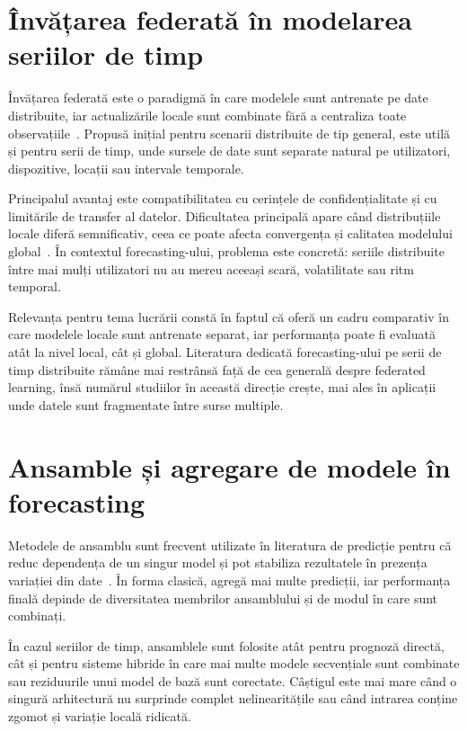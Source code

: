 \section{Învățarea federată în modelarea seriilor de timp}

Învățarea federată este o paradigmă în care modelele sunt antrenate pe date distribuite, iar actualizările locale sunt combinate fără a centraliza toate observațiile~\cite{mcmahan2017fedavg, kairouz2021fl}. Propusă inițial pentru scenarii distribuite de tip general, este utilă și pentru serii de timp, unde sursele de date sunt separate natural pe utilizatori, dispozitive, locații sau intervale temporale.

Principalul avantaj este compatibilitatea cu cerințele de confidențialitate și cu limitările de transfer al datelor. Dificultatea principală apare când distribuțiile locale diferă semnificativ, ceea ce poate afecta convergența și calitatea modelului global~\cite{kairouz2021fl}. În contextul forecasting-ului, problema este concretă: seriile distribuite între mai mulți utilizatori nu au mereu aceeași scară, volatilitate sau ritm temporal.

Relevanța pentru tema lucrării constă în faptul că oferă un cadru comparativ în care modelele locale sunt antrenate separat, iar performanța poate fi evaluată atât la nivel local, cât și global. Literatura dedicată forecasting-ului pe serii de timp distribuite rămâne mai restrânsă față de cea generală despre federated learning, însă numărul studiilor în această direcție crește, mai ales în aplicații unde datele sunt fragmentate între surse multiple.

\section{Ansamble și agregare de modele în forecasting}

Metodele de ansamblu sunt frecvent utilizate în literatura de predicție pentru că reduc dependența de un singur model și pot stabiliza rezultatele în prezența variației din date~\cite{dietterich2000ensemble, zhou2012ensemble}. În forma clasică, agregă mai multe predicții, iar performanța finală depinde de diversitatea membrilor ansamblului și de modul în care sunt combinați.

În cazul seriilor de timp, ansamblele sunt folosite atât pentru prognoză directă, cât și pentru sisteme hibride în care mai multe modele secvențiale sunt combinate sau reziduurile unui model de bază sunt corectate. Câștigul este mai mare când o singură arhitectură nu surprinde complet nelinearitățile sau când intrarea conține zgomot și variație locală ridicată.

